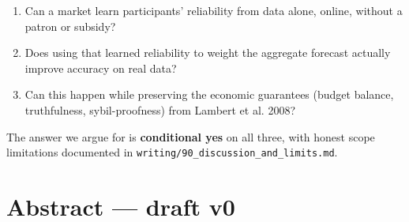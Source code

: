 \documentclass[11pt,a4paper,openany]{report}
\begin{document}
\begin{enumerate}
  \item Can a market learn participants' reliability from data alone, online,
    without a patron or subsidy?
  \item Does using that learned reliability to weight the aggregate forecast
    actually improve accuracy on real data?
  \item Can this happen while preserving the economic guarantees (budget
    balance, truthfulness, sybil-proofness) from Lambert et al. 2008?
\end{enumerate}

The answer we argue for is \textbf{conditional yes} on all three, with honest
scope limitations documented in \texttt{writing/90\_discussion\_and\_limits.md}.

\section{Abstract — draft v0}
\end{document}
